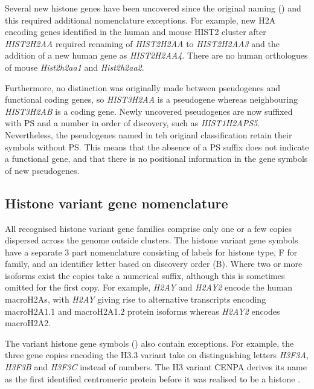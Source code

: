 	Several new histone genes have been uncovered since the original naming () 
	and this required additional nomenclature exceptions.
	For example, new H2A encoding genes identified in the human and mouse HIST2 cluster after \textit{HIST2H2AA} 
	required renaming of \textit{HIST2H2AA} to \textit{HIST2H2AA3} 
	and the addition of a new human gene as \textit{HIST2H2AA4}. 
	There are no human orthologues of mouse \textit{Hist2h2aa1} and \textit{Hist2h2aa2}.
	
	Furthermore, no distinction was originally made between pseudogenes and functional coding genes, 
	so \textit{HIST3H2AA} is a pseudogene whereas neighbouring \textit{HIST3H2AB} is a coding gene.
	Newly uncovered pseudogenes are now suffixed with PS and a number in order of discovery, 
	such as \textit{HIST1H2APS5}. 
	Nevertheless, the pseudogenes named in teh origianl classification retain their symbols without PS. 
	This means that the absence of a PS suffix does not indicate a functional gene, 
	and that there is no positional information in the gene symbols of new pseudogenes.

  \subsection{Histone variant gene nomenclature}
	
	All recognised histone variant gene families comprise only one or a few copies 
	dispersed across the genome outside clusters.
	The histone variant gene symbols have a separate 3 part nomenclature 
	consisting of labels for histone type, F for family, 
	and an identifier letter based on discovery order (B).
	Where two or more isoforms exist the copies take a numerical suffix, 
	although this is sometimes omitted for the first copy. 
	For example, \textit{H2AY} and \textit{H2AY2} encode the human macroH2As, 
	with \textit{H2AY} giving rise to alternative transcripts encoding macroH2A1.1 and macroH2A1.2 protein isoforms 
	whereas \textit{H2AY2} encodes macroH2A2.
	
	The variant histone gene symbols () also contain exceptions.
	For example, the three gene copies encoding the H3.3 variant 
	take on distinguishing letters \textit{H3F3A}, \textit{H3F3B} and \textit{H3F3C} instead of numbers. 
	The H3 variant CENPA derives its name as the first identified centromeric protein \cite{CENPA-first-report} 
	before it was realised to be a histone \citep{CENPA-copurifies-histones, CENPA-sequence-analysis}.
	
